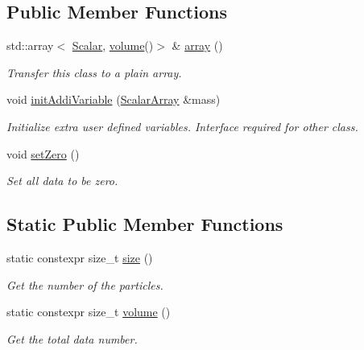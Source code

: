 \subsection*{Public Member Functions}
\begin{DoxyCompactItemize}
\item 
std\+::array$<$ \mbox{\hyperlink{classdynamics_a444c7534e86115117798563cb0e43cde}{Scalar}}, \mbox{\hyperlink{classdynamics_ada4a2418d86de3072e1a238a95e6bdb2}{volume}}()$>$ \& \mbox{\hyperlink{classdynamics_add2d27f86c6f415999e9e7dd05cc8025}{array}} ()
\begin{DoxyCompactList}\small\item\em Transfer this class to a plain array. \end{DoxyCompactList}\item 
void \mbox{\hyperlink{classdynamics_a4f6f246917f12269d3bd4a428bd40752}{init\+Addi\+Variable}} (\mbox{\hyperlink{classdynamics_ac31f831ea1577092662dafd2daba0f48}{Scalar\+Array}} \&mass)
\begin{DoxyCompactList}\small\item\em Initialize extra user defined variables. Interface required for other class. \end{DoxyCompactList}\item 
void \mbox{\hyperlink{classdynamics_a4dc0dd48fd48ef5cfc0128faaeb22b32}{set\+Zero}} ()
\begin{DoxyCompactList}\small\item\em Set all data to be zero. \end{DoxyCompactList}\end{DoxyCompactItemize}
\subsection*{Static Public Member Functions}
\begin{DoxyCompactItemize}
\item 
static constexpr size\+\_\+t \mbox{\hyperlink{classdynamics_a414656e44a6981327ae59af4deea9b8c}{size}} ()
\begin{DoxyCompactList}\small\item\em Get the number of the particles. \end{DoxyCompactList}\item 
static constexpr size\+\_\+t \mbox{\hyperlink{classdynamics_ada4a2418d86de3072e1a238a95e6bdb2}{volume}} ()
\begin{DoxyCompactList}\small\item\em Get the total data number. \end{DoxyCompactList}\end{DoxyCompactItemize}

